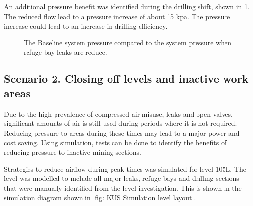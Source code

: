 	An additional pressure benefit was identified during the drilling shift, shown in  \cref{fig: RefugeBay Pressures.}. The reduced flow lead to a pressure increase of about 15 kpa. The pressure increase could lead to an increase in drilling efficiency.
	\begin{figure}[h]
		\centering
		
		\caption{The Baseline system pressure compared to the system pressure when refuge bay leaks are reduce.}
		\label{fig: RefugeBay Pressures.}
	\end{figure}  
	\clearpage
	\subsection{Scenario 2. Closing off levels and inactive work areas}
	Due to the high prevalence of compressed air misuse, leaks and open valves, significant amounts of air is still used during periods where it is not required. Reducing pressure to areas during these times may lead to a major power and cost saving. Using simulation, tests can be done to identify the benefits of reducing pressure to inactive mining sections.
	\par 
	Strategies to reduce airflow during peak times was simulated for level 105L. The level was modelled to include all major leaks, refuge bays and drilling sections that were manually identified from the level investigation. This is shown in the simulation diagram shown in \cref{fig: KUS Simulation level layout}. 
